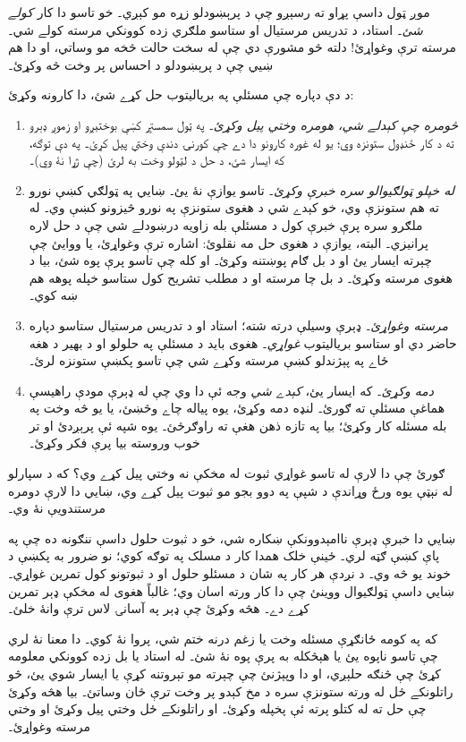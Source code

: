 \documentclass[../../../include/open-logic-section]{subfiles}
\begin{document}


موږ ټول داسې پړاو ته رسېږو چې د پرېښودلو زړه مو کېږي۔
خو تاسو دا کار \emph{کولے شئ}۔ استاد، د تدريس مرستيال
او ستاسو ملګري زده کوونکي مرسته کولے شي۔ مرسته ترې
وغواړئ!{} دلته څو مشورې دي چې له سخت حالت څخه مو وساتي،
او دا هم ښيي چې د پرېښودلو د احساس پر وخت څه وکړئ۔

د دې دپاره چې مسئلې په برياليتوب حل کړے شئ، دا کارونه وکړئ:
\begin{enumerate}
\item \emph{څومره چې کېدلے شي، هومره وختي پيل وکړئ۔}
  په ټول سمسټر کښې بوختېږو او زموږ ډېرو ته د کار ځنډول
  ستونزه وي؛ يو له غوره کارونو دا دے چې کورنۍ دندې
  وختي پيل کړئ۔ په دې توګه، که ايسار شئ، د حل د لټولو
  وخت به لرئ (چې ژړا نۀ وي)۔
\item \emph{له خپلو ټولګيوالو سره خبرې وکړئ}۔ تاسو يوازې
  نۀ يئ۔ ښايي په ټولګي کښې نورو ته هم ستونزې وي، خو
  کېدے شي د هغوى ستونزې په نورو څيزونو کښې وي۔ له
  ملګرو سره پرې خبرې کول د مسئلې بله زاويه درښودلے شي
  چې د حل لاره پرانيزي۔ البته، يوازې د هغوى حل مه نقلوئ:
  اشاره ترې وغواړئ، يا ووايئ چې چېرته ايسار يئ او د بل
  ګام پوښتنه وکړئ۔ او کله چې تاسو پرې پوه شئ، بيا د
  هغوى مرسته وکړئ۔ د بل چا مرسته او د مطلب تشريح کول
  ستاسو خپله پوهه هم ښه کوي۔
\item \emph{مرسته وغواړئ۔} ډېرې وسيلې درته شته؛ استاد
  او د تدريس مرستيال ستاسو دپاره حاضر دي او ستاسو
  برياليتوب \emph{غواړي}۔ هغوى بايد د مسئلې په حلولو او
  د بهير د هغه ځاے په پېژندلو کښې مرسته وکړے شي چې
  تاسو پکښې ستونزه لرئ۔
\item \emph{دمه وکړئ۔} که ايسار يئ، \emph{کېدے شي}
  وجه ئې دا وي چې له ډېرې مودې راهيسې هماغې مسئلې ته
  ګورئ۔ لنډه دمه وکړئ، يوه پياله چاے وڅښئ، يا يو څه
  وخت په بله مسئله کار وکړئ؛ بيا په تازه ذهن هغې ته
  راوګرځئ۔ يوه شپه ئې پرېږدئ او تر خوب وروسته بيا پرې
  فکر وکړئ۔
\end{enumerate}

ګورئ چې دا لارې له تاسو غواړي ثبوت له مخکې نه وختي
پيل کړے وي؟ که د سپارلو له نېټې يوه ورځ وړاندې د شپې
په دوو بجو مو ثبوت پيل کړے وي، ښايي دا لارې دومره
مرستندويې نۀ وي۔

ښايي دا خبرې ډېرې ناامېدوونکې ښکاره شي، خو د ثبوت
حلول داسې ننګونه ده چې په پاې کښې ګټه لري۔ ځينې
خلک همدا کار د مسلک په توګه کوي؛ نو ضرور به پکښې
د خوند يو څه وي۔ د نږدې هر کار په شان د مسئلو
حلول او د ثبوتونو کول تمرين غواړي۔ ښايي داسې
ټولګيوال ووينئ چې دا کار ورته اسان وي؛ غالباً
هغوى له مخکې ډېر تمرين کړے دے۔ هڅه وکړئ چې ډېر
په آسانۍ لاس ترې وانۀ خلئ۔

که په کومه ځانګړې مسئله وخت يا زغم درنه ختم شي،
پروا نۀ کوي۔ دا معنا نۀ لري چې تاسو ناپوه يئ يا
هېڅکله به پرې پوه نۀ شئ۔ له استاد يا بل زده
کوونکي معلومه کړئ چې څنګه حلېږي، او دا وپېژنئ
چې چېرته مو تېروتنه کړې يا ايسار شوي يئ، څو
راتلونکے ځل له ورته ستونزې سره د مخ کېدو پر
وخت ترې ځان وساتئ۔ بيا هڅه وکړئ چې حل ته له
کتلو پرته ئې پخپله وکړئ۔ او راتلونکے ځل وختي
پيل وکړئ او وختي مرسته وغواړئ۔
\end{document}

